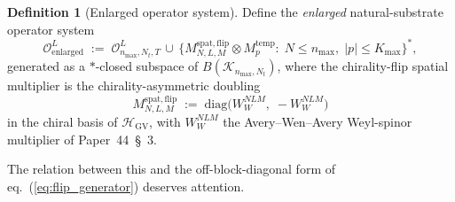 \documentclass[11pt,a4paper]{article}
\theoremstyle{plain}
\theoremstyle{definition}
\newtheorem{definition}[theorem]{Definition}
\newcommand{\nmax}{n_{\max}}
\newcommand{\Nt}{N_{t}}
\newcommand{\Kmax}{K_{\max}}
\newcommand{\Krein}{\mathcal{K}}
\newcommand{\Op}{\mathcal{O}}
\newcommand{\HGV}{\mathcal{H}_{\mathrm{GV}}}
\newcommand{\spat}{\mathrm{spat}}
\newcommand{\temp}{\mathrm{temp}}
\begin{document}
\begin{definition}[Enlarged operator system]
\label{def:enlarged_substrate}
Define the \emph{enlarged} natural-substrate operator system
\begin{equation}\label{eq:enlarged_substrate}
   \Op^{L}_{\mathrm{enlarged}}
   \;:=\; \Op^{L}_{\nmax, \Nt, T}
   \,\cup\, \bigl\{ M^{\spat,\mathrm{flip}}_{N, L, M} \otimes M^{\temp}_{p}
     :\; N \le \nmax,\; |p| \le \Kmax \bigr\}^{\ast},
\end{equation}
generated as a $\ast$-closed subspace of $B(\Krein_{\nmax, \Nt})$,
where the chirality-flip spatial multiplier is the chirality-asymmetric
doubling
\begin{equation}\label{eq:flip_minimal}
   M^{\spat,\mathrm{flip}}_{N, L, M}
   \;:=\; \mathrm{diag}\bigl(W^{N L M}_{W},\; -W^{N L M}_{W}\bigr)
\end{equation}
in the chiral basis of $\HGV$, with $W^{N L M}_{W}$ the Avery--Wen--Avery
Weyl-spinor multiplier of Paper~44~\S~3.
\end{definition}

The relation between this and the off-block-diagonal form of
eq.~(\ref{eq:flip_generator}) deserves attention.
\end{document}
